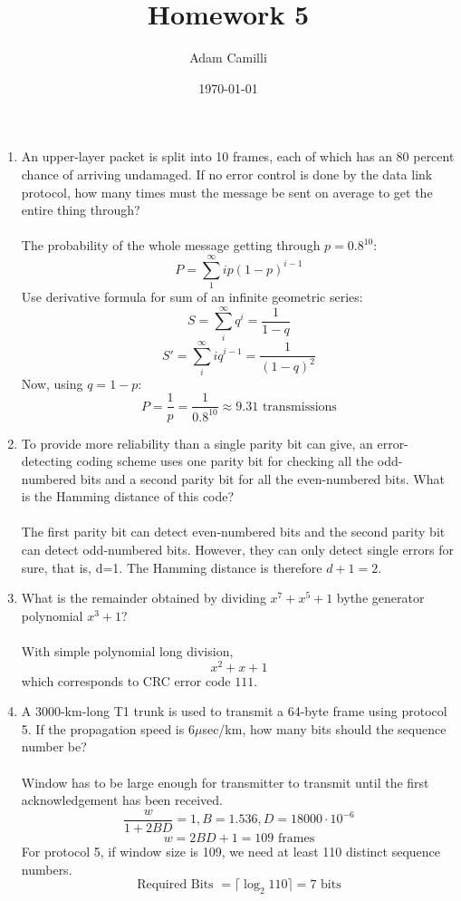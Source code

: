 \documentclass[12pt]{article}
\begin{document}
\title{Homework 5}
\author{Adam Camilli}
\date{\today}

\maketitle

\begin{enumerate}
\item An upper-layer packet is split into 10 frames, each of which has an 80 percent chance of arriving undamaged. If no error control is done by the data link protocol, how many times must the message be sent on average to get the entire thing through? \\ \\
The probability of the whole message getting through $p = 0.8^{10} $:
\[P = \sum_1^{\infty} ip(1-p)^{i-1} \]
Use derivative formula for sum of an infinite geometric series:
\[ S = \sum_i^{\infty} q^{i} = \frac{1}{1-q} \]
\[ S' = \sum_i^{\infty} iq^{i-1} = \frac{1}{(1-q)^2} \]
Now, using $ q = 1 - p $:
\[ P = \frac{1}{p} = \frac{1}{0.8^{10}} \approx 9.31 \text{ transmissions} \]

\item To provide more reliability than a single parity bit can give, an error-detecting coding scheme uses one parity bit for checking all the odd-numbered bits and a second parity bit for all the even-numbered bits. What is the Hamming distance of this code? \\ \\

The first parity bit can detect even-numbered bits and the second parity bit can detect odd-numbered bits. However, they can only detect single errors for sure, that is, d=1. The Hamming distance is therefore $d+1=2$.

\item What is the remainder obtained by dividing $x^7 + x^5 + 1$ bythe generator polynomial $x^3+1$? \\ \\
With simple polynomial long division,
\[x^2 + x + 1\]
which corresponds to CRC error code $111$.

\item A 3000-km-long T1 trunk is used to transmit a 64-byte frame using protocol 5. If the propagation speed is $6 \mu$sec/km, how many bits should the sequence number be? \\ \\

Window has to be large enough for transmitter to transmit until the first acknowledgement has been received. 
\[\frac{w}{1+2BD} = 1 , B = 1.536, D = 18000 \cdot 10^{-6} \]
\[ w = 2BD + 1 = 109 \text{ frames}\]
For protocol 5, if window size is 109, we need at least 110 distinct sequence numbers.
\[ \text{Required Bits } = \lceil \log_2 110 \rceil = 7 \text{ bits}\]


\end{enumerate}
\end{document}
